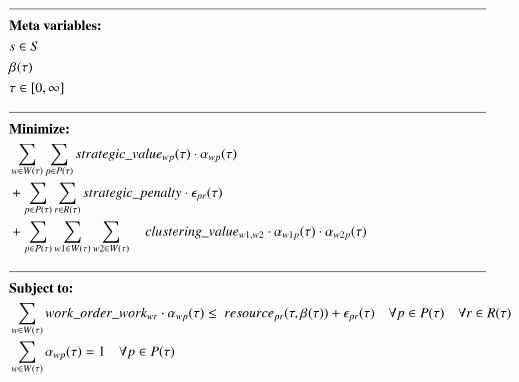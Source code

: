 
\newpage
\begin{alignat}{2}
	& \text{\rule{\linewidth}{0.4pt}} \notag\\
	& \textbf{Meta variables:} \notag\\
	& \ElementScheduler \in \SetScheduler \\
	& \VarTacticalWork{}{} \\ 
	& \tau \in [0, \infty] \\
	& \text{\rule{\linewidth}{0.4pt}} \notag\\
	& \textbf{Minimize:} \notag                                                                                                                                                        \\
	& \sum_{\ElementWorkOrder \in \SetWorkOrder{}} \sum_{\ElementPeriod \in \SetPeriod} \ParStrategicValue \cdot \VarStrategicWorkOrderAssignment{\ElementWorkOrder}{\ElementPeriod}  \notag\\ 
	& + \sum_{\ElementPeriod \in \SetPeriod} \sum_{\ElementResource \in \SetResource} \ParStrategicPenalty \cdot \VarStrategicExcess     \notag                                              \\
	& + \sum_{\ElementPeriod \in \SetPeriod} \sum_{\ElementWorkOrder1 \in \SetWorkOrder{}} \sum_{\ElementWorkOrder2 \in \SetWorkOrder{}} 	 \quad \ParClusteringValue \cdot \VarStrategicWorkOrderAssignment{\ElementWorkOrder1}{\ElementPeriod} \cdot \VarStrategicWorkOrderAssignment{\ElementWorkOrder2}{\ElementPeriod}  \\
	& \text{\rule{\linewidth}{0.4pt}} \notag\\
	& \textbf{Subject to:} \notag                                                                                                                                                      \\
	& \sum_{\ElementWorkOrder \in \SetWorkOrder{}} \ParStrategicWorkOrderWeight \cdot \VarStrategicWorkOrderAssignment{\ElementWorkOrder}{\ElementPeriod} \leq \ \ParStrategicResource + \VarStrategicExcess                                                                           \quad \forall \ElementPeriod \in \SetPeriod \quad \forall \ElementResource \in \SetResource                                                                                      \\
	& \sum_{\ElementWorkOrder \in \SetWorkOrder{}} \VarStrategicWorkOrderAssignment{\ElementWorkOrder}{\ElementPeriod} = 1              \quad \forall \ElementPeriod \in \SetPeriod                                                                                                                                      \\

\end{alignat}
